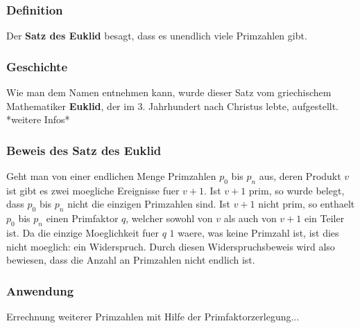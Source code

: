 \subsubsection{Definition}
Der \textbf{Satz des Euklid} besagt, dass es unendlich viele Primzahlen gibt.
\subsubsection{Geschichte}
Wie man dem Namen entnehmen kann, wurde dieser Satz vom griechischem Mathematiker \textbf{Euklid}, der im 3. Jahrhundert nach Christus lebte, aufgestellt.
*weitere Infos*
\subsubsection{Beweis des Satz des Euklid}
Geht man von einer endlichen Menge Primzahlen $p_0$ bis $p_n$ aus, deren Produkt $v$ ist gibt es zwei moegliche Ereignisse fuer $v + 1$.
Ist $v + 1$ prim, so wurde belegt, dass  $p_0$ bis $p_n$ nicht die einzigen Primzahlen sind.
Ist $v + 1$ nicht prim, so enthaelt $p_0$ bis $p_n$ einen Primfaktor $q$, welcher sowohl von $v$ als auch von $v + 1$ ein Teiler ist. Da die einzige Moeglichkeit fuer $q$ $1$ waere, was keine Primzahl ist, ist dies nicht moeglich: ein Widerspruch.
Durch diesen Widerspruchsbeweis wird also bewiesen, dass die Anzahl an Primzahlen nicht endlich ist.
\subsubsection{Anwendung}
Errechnung weiterer Primzahlen mit Hilfe der Primfaktorzerlegung...